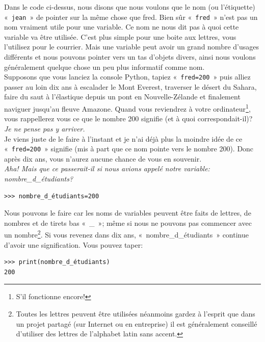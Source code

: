 Dans le code ci-dessus, nous disons que nous voulons que le nom (ou l'étiquette) «~\texttt{jean}~» de pointer
sur la même chose que fred. Bien sûr «~\texttt{fred}~» n'est pas un nom vraiment utile pour une variable.
Ce nom ne nous dit pas à quoi cette variable va être utilisée. C'est plus simple pour une boite aux lettres, vous l'utilisez pour le courrier. Mais une variable peut avoir un grand nombre d'usages différents et nous pouvons 
pointer vers un tas d'objets divers, ainsi nous voulons généralement quelque chose un peu plus informatif comme nom.
\\

Supposons que vous lanciez la console Python, tapiez «~\texttt{fred=200}~» puis alliez passer au loin dix ans à escalader le Mont Everest, traverser le désert du Sahara, faire du saut à l'élastique depuis un pont en Nouvelle-Zélande et finalement naviguer jusqu'au fleuve Amazone. Quand vous reviendrez à votre ordinateur\footnote{S'il fonctionne encore!}, vous rappellerez vous ce que le nombre 200 signifie (et à quoi correspondait-il)?\\

\emph{Je ne pense pas y arriver.}\\

Je viens juste de le faire à l'instant et je n'ai déjà plus la moindre idée de ce «~\texttt{fred=200}~» signifie (mis à part que ce nom pointe vers le nombre 200). Donc après dix ans, vous n'aurez aucune chance de vous en souvenir.\\


\emph{Aha! Mais que ce passerait-il si nous avions appelé notre variable: nombre\_d\_étudiants?}\\

\begin{Verbatim}[frame=single,rulecolor=\color{mbleu}, label=à taper]
>>> nombre_d_étudiants=200
\end{Verbatim}

Nous pouvons le faire car les noms de variables peuvent être faits de lettres, de nombres et de tirets bas «~\_~»; même si nous ne pouvons pas commencer avec un nombre\footnote{Toutes les lettres peuvent être utilisées néanmoins gardez à l'esprit que dans un projet partagé (sur Internet ou en entreprise) il est généralement conseillé d'utiliser des lettres de l'alphabet latin sans accent.}. Si vous revenez dans dix ans, «~nombre\_d\_étudiants~» continue d'avoir une signification. Vous pouvez taper:

\begin{Verbatim}[frame=single,rulecolor=\color{mbleu}, label=à taper]
>>> print(nombre_d_étudiants)
200
\end{Verbatim}

